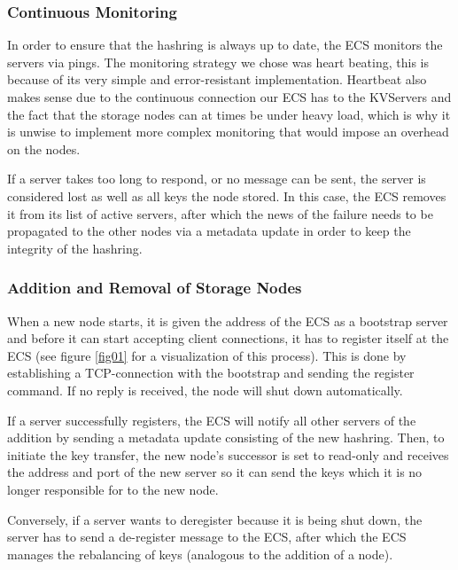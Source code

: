 \documentclass[sigconf]{acmart}
\begin{document}
\subsubsection{Continuous Monitoring}\label{continuous-monitoring}
In order to ensure that the hashring is always up to date, the ECS monitors the servers via pings. The monitoring strategy we chose was heart beating, this is because of its very simple and error-resistant implementation. Heartbeat also makes sense due to the continuous connection our ECS has to the KVServers and the fact that the storage nodes can at times be under heavy load, which is why it is unwise to implement more complex monitoring that would impose an overhead on the nodes.

If a server takes too long to respond, or no message can be sent, the server is considered lost as well as all keys the node stored. In this case, the ECS removes it from its list of active servers, after which the news of the failure needs to be propagated to the other nodes via a metadata update in order to keep the integrity of the hashring.

\subsubsection{Addition and Removal of Storage Nodes}
When a new node starts, it is given the address of the ECS as a bootstrap server and before it can start accepting client connections, it has to register itself at the ECS (see figure \ref{fig01} for a visualization of this process). This is done by establishing a TCP-connection with the bootstrap and sending the register command.
If no reply is received, the node will shut down automatically.

If a server successfully registers, the ECS will notify all other servers of the addition by sending a metadata update consisting of the new hashring.
Then, to initiate the key transfer, the new node's successor is set to read-only and receives the address and port of the new server so it can send the keys which it is no longer responsible for to the new node.

Conversely, if a server wants to deregister because it is being shut down, the server has to send a de-register message to the ECS, after which the ECS manages the rebalancing of keys (analogous to the addition of a node).
\end{document}
